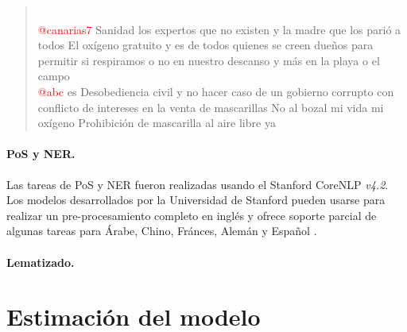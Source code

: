 \begin{quote}
	\vspace{12pt} \\
	\textcolor{red}{@canarias7} Sanidad los expertos que no existen y la madre que los parió a todos El oxígeno gratuito y es de todos quienes se creen dueños para permitir si respiramos o no en nuestro descanso y más en la playa o el campo 
	\vspace{12pt} \\
	\textcolor{red}{@abc} es Desobediencia civil y no hacer caso de un gobierno corrupto con conflicto de intereses en la venta de mascarillas No al bozal mi vida mi oxígeno Prohibición de mascarilla al aire libre ya 
\end{quote}

\paragraph{PoS y NER.} Las tareas de PoS y NER fueron realizadas usando el Stanford CoreNLP \textit{v4.2}. Los modelos desarrollados por la Universidad de Stanford pueden usarse para realizar un pre-procesamiento completo en inglés y ofrece soporte parcial de algunas tareas para Árabe, Chino, Fránces, Alemán y Español \citep{manning2014stanford}.

\paragraph{Lematizado.}

\section{Estimación del modelo}











